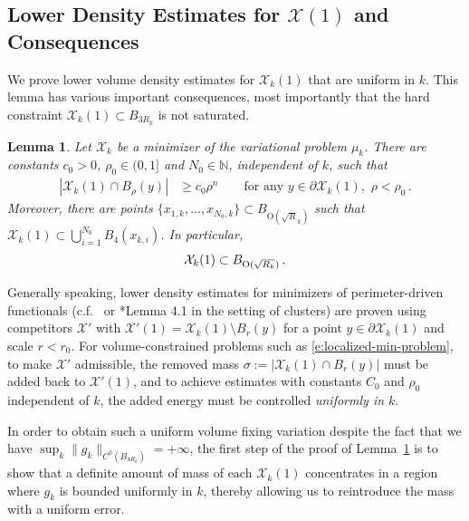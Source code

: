 \documentclass[10pt,reqno]{amsart}
\numberwithin{equation}{section}
\newtheorem{lemma}[theorem]{Lemma}
\theoremstyle{definition}
\newcommand{\Orm}{\mathrm{O}}
\newcommand{\X}{\mathcal{X}}
\begin{document}
{\subsection{Lower Density Estimates for $\X(1)$ and Consequences}
We prove lower volume density estimates for $\X_k(1)$ that are uniform in $k$. 
This lemma  has various important consequences, most importantly that the hard constraint $\X_k(1) \subset B_{3R_k}$ is not saturated.\\

\begin{lemma}\label{lem: density estimates}
    Let $\mathcal{X}_{k}$ be a minimizer of the variational problem $\mu_{k}$. There are constants $c_0>0$, $\rho_0\in (0,1]$ {and $N_0\in \mathbb{N}$}, independent of $k$, such that 
    \begin{align}
        \label{eqn: lower denisty estimate}
    |\mathcal{X}_k(1) \cap B_\rho(y)| &\geq c_0 \rho^n\qquad \mbox{for any } y\in \partial \X_k(1),\,\, \rho < \rho_0 \,.
        \end{align} 
{Moreover, there are points 
$\{x_{1,k},\dots ,x_{N_0, k}\} \subset B_{{ \Orm(\sqrt{R}_k)}}$
such that $\X_k(1) \subset \bigcup_{i=1}^{N_0} {B_4}(x_{k,i})$. In particular,}
\begin{align}\label{eq:nonsaturation}
    \X_k(1) \subset B_{{{\rm O}(\sqrt{R_k})}}\,.
\end{align}
\end{lemma}

Generally speaking, lower density estimates for minimizers of perimeter-driven functionals  (c.f.~ \cite[Theorem~16.14]{Mag12} or \cite{BroNov24}*{Lemma 4.1} in the setting of clusters) are proven using competitors $\X'$ with $\X'(1) = \X_k(1) \setminus B_r(y)$ for a point $y \in \partial \X_k(1)$ and scale $r< r_0$. For  volume-constrained problems such as \eqref{e:localized-min-problem}, to make $\X'$ admissible, the removed mass $\sigma:= |\X_k(1) \cap B_r(y)|$ must be added back to $\X'(1)$, and to achieve estimates with constants $C_0$ and $\rho_0$ independent of $k$,  the added energy must be controlled {\it uniformly in $k$}.

In order to obtain such a uniform volume fixing variation despite the fact that we have $\sup_k \|g_k\|_{C^0(B_{4R_k})} = + \infty$,  the first step of the proof of Lemma~\ref{lem: density estimates} is to show that a definite amount of mass of each $\X_k(1)$ concentrates in a region where $g_k$ is bounded uniformly in $k$, thereby allowing us to reintroduce the mass with a uniform error.\\

}
\end{document}
